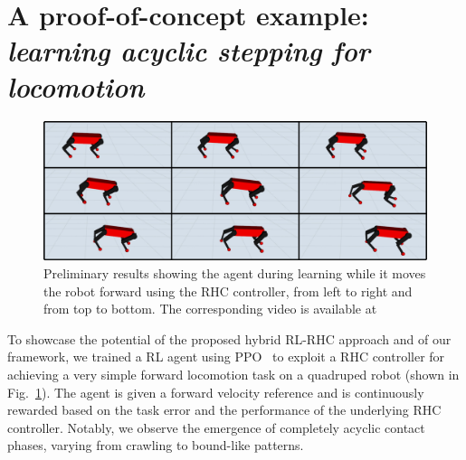 \section{A proof-of-concept example: \textnormal{\textit{learning acyclic stepping for locomotion}}}
\begin{figure}[t]
	\centering
	\includegraphics[width=0.9\columnwidth]{imgs/proof_of_concept.pdf}
	\caption{Preliminary results showing the agent during learning while it moves the robot forward using the RHC controller, from left to right and from top to bottom. The corresponding video is available at~\cite{web::poc_link}}
	\label{fig:proof}
\end{figure}
To showcase the potential of the proposed hybrid RL-RHC approach and of our framework, we trained a RL agent using PPO~\cite{rl:schulman2017proximal} to exploit a RHC controller for achieving a very simple forward locomotion task on a quadruped robot (shown in Fig.~\ref{fig:proof}). The agent is given a forward velocity reference and is continuously rewarded based on the task error and the performance of the underlying RHC controller. Notably, we observe the emergence of completely acyclic contact phases, varying from crawling to bound-like patterns.
 